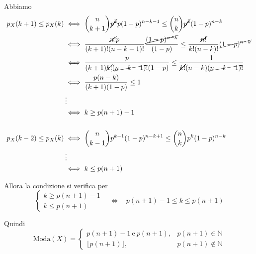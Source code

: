\begin{enumerate}
Abbiamo\begin{equation*}
\begin{aligned}
p_{X}( k+1) \leq p_{X}( k) & \iff \binom{n}{k+1}\cancel{p^{k}} p( 1-p)^{n-k-1} \leq \binom{n}{k}\cancel{p^{k}}( 1-p)^{n-k}\\
 & \iff \frac{\cancel{n!} p}{( k+1) !( n-k-1) !}\frac{\cancel{( 1-p)^{n-k}}}{( 1-p)} \leq \frac{\cancel{n!}}{k!( n-k) !}\cancel{( 1-p)^{n-k}}\\
 & \iff \frac{p}{( k+1)\cancel{k!}\cancel{( n-k-1) !}( 1-p)} \leq \frac{1}{\cancel{k!}( n-k)\cancel{( n-k-1) !}}\\
 & \iff \frac{p( n-k)}{( k+1)( 1-p)} \leq 1\\
 & \vdots \\
 & \iff k\geq p( n+1) -1\\
 & \\
p_{X}( k-2) \leq p_{X}( k) & \iff \binom{n}{k-1} p^{k-1}( 1-p)^{n-k+1} \leq \binom{n}{k} p^{k}( 1-p)^{n-k}\\
 & \vdots \\
 & \iff k\leq p( n+1)
\end{aligned}
\end{equation*}

Allora la condizione si verifica per\begin{equation*}
\begin{cases}
k\geq p( n+1) -1\\
k\leq p( n+1)
\end{cases} \ \ \ \ \iff \ \ \ \ p( n+1) -1\leq k\leq p( n+1)
\end{equation*}

Quindi\begin{equation*}
\text{Moda}( X) =\begin{cases}
p( n+1) -1\ \text{e} \ p( n+1) , & p( n+1) \in \mathbb{N}\\
\lfloor p( n+1)\rfloor , & p( n+1) \notin \mathbb{N}
\end{cases}
\end{equation*}
\end{enumerate}
\Soluzione

